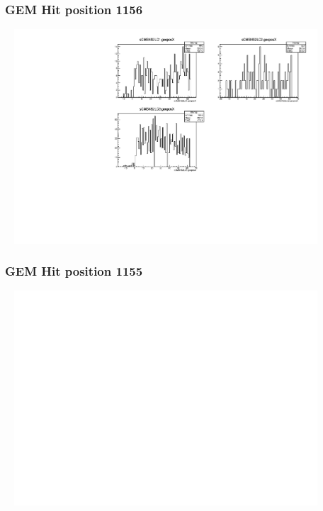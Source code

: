 \documentclass[slidestop,compress,mathserif]{beamer}
\begin{document}
\begin{frame}\frametitle{GEM Hit position 1156}
	 \includegraphics[width=12cm,height=8cm]{GEM_Hit_position_1156.pdf}
\end{frame}
\begin{frame}\frametitle{GEM Hit position 1155}
	 \includegraphics[width=12cm,height=8cm]{GEM_Hit_position_1155.pdf}
\end{frame}
\end{document}
